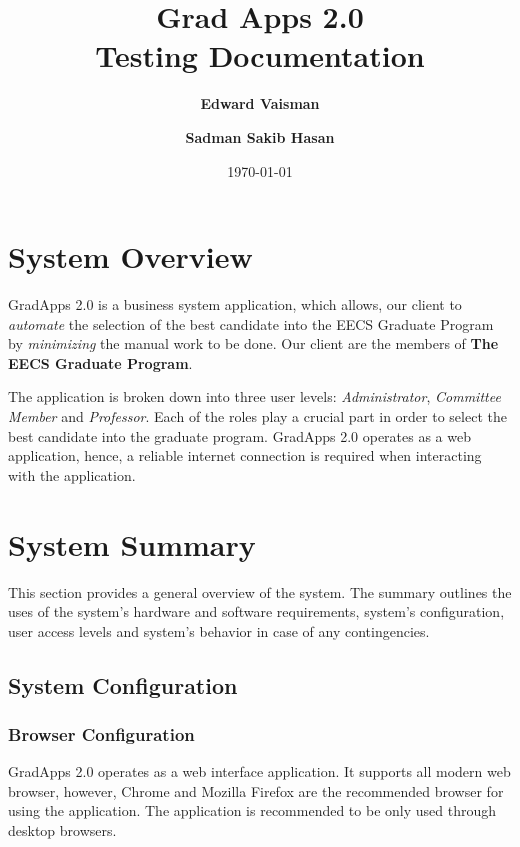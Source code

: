 \documentclass[fontsize=12pt,paper=letter,twoside]{scrartcl}
\author{\textbf{Edward Vaisman}
\and \textbf{Sadman Sakib Hasan}
}
\date{\today} %
\begin{document}
\title{Grad Apps 2.0 \\ Testing Documentation}
\maketitle

\newpage

\tableofcontents

\newpage



\section{System Overview}

GradApps 2.0 is a business system application, which allows, our client to \emph{automate} the selection of the best candidate into the EECS Graduate Program by \emph{minimizing} the manual work to be done. Our client are the members of \textbf{The EECS Graduate Program}.

\bigskip
\noindent The application is broken down into three user levels: \emph{Administrator}, \emph{Committee Member} and \emph{Professor}. Each of the roles play a crucial part in order to select the best candidate into the graduate program. GradApps 2.0 operates as a web application, hence, a reliable internet connection is required when interacting with the application.

\newpage
\section{System Summary}
This section provides a general overview of the system. The summary outlines the uses of
the system's hardware and software requirements, system’s configuration, user access levels and
system’s behavior in case of any contingencies.

\subsection{System Configuration} \label{system_conf}

\subsubsection{Browser Configuration}
GradApps 2.0 operates as a web interface application. It supports all modern web browser, however, Chrome and Mozilla Firefox are the recommended browser for using the application. The application is recommended to be only used through desktop browsers.
\end{document}

